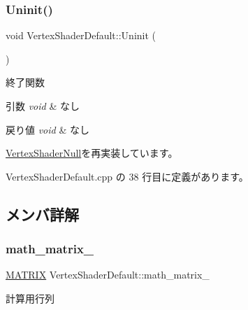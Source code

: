 \subsubsection{\texorpdfstring{Uninit()}{Uninit()}}
{\footnotesize\ttfamily void Vertex\+Shader\+Default\+::\+Uninit (\begin{DoxyParamCaption}{ }\end{DoxyParamCaption})\hspace{0.3cm}{\ttfamily [virtual]}}



終了関数 


\begin{DoxyParams}{引数}
{\em void} & なし \\
\hline
\end{DoxyParams}

\begin{DoxyRetVals}{戻り値}
{\em void} & なし \\
\hline
\end{DoxyRetVals}


\mbox{\hyperlink{class_vertex_shader_null_adf758f295d2803c6d8bd7e05e461abec}{Vertex\+Shader\+Null}}を再実装しています。



 Vertex\+Shader\+Default.\+cpp の 38 行目に定義があります。



\subsection{メンバ詳解}
\mbox{\label{class_vertex_shader_default_a91a7b35448e9b5d93b69a92f1ba17f8b}} 
\subsubsection{\texorpdfstring{math\+\_\+matrix\+\_\+}{math\_matrix\_}}
{\footnotesize\ttfamily \mbox{\hyperlink{_matrix_8h_a032295cd9fb1b711757c90667278e744}{M\+A\+T\+R\+IX}} Vertex\+Shader\+Default\+::math\+\_\+matrix\+\_\+\hspace{0.3cm}{\ttfamily [private]}}



計算用行列 



